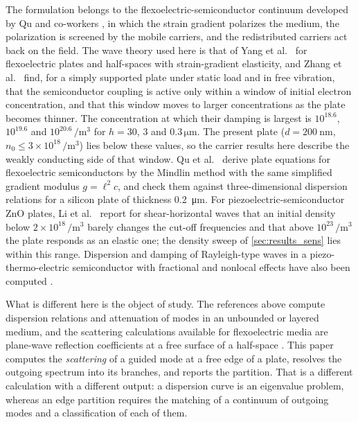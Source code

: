 The formulation belongs to the flexoelectric-semiconductor continuum developed
by Qu and co-workers \cite{qu2020mobile,qu2022thermal}, in which the strain
gradient polarizes the medium, the polarization is screened by the mobile
carriers, and the redistributed carriers act back on the field.  The wave theory used here is that of Yang et al.\ \cite{yang2018lamb,yang2020rayleigh}
for flexoelectric plates and half-spaces with strain-gradient elasticity, and Zhang et al.\ \cite{zhang2025pscplate} find, for a simply supported plate under static load and in free vibration, that the semiconductor coupling is active only within a window of initial electron concentration, and that this window moves to larger concentrations as the plate becomes thinner.  The concentration at which their damping is largest is $10^{18.6}$, $10^{19.6}$ and $10^{20.6}\,\si{\per\cubic\metre}$ for $h=30$, $3$ and $0.3\,\si{\micro\metre}$.  The present plate ($d=\SI{200}{\nano\metre}$, $n_0\le3\times10^{18}\,\si{\per\cubic\metre}$) lies below these values, so the carrier results here describe the weakly conducting side of that window.  Qu et al.\ \cite{qu2023drag} derive plate equations for flexoelectric semiconductors by the Mindlin method with the same simplified gradient modulus $g=\ell^2c$, and check them against three-dimensional dispersion relations for a silicon plate of thickness \SI{0.2}{\micro\metre}.  For piezoelectric-semiconductor ZnO plates, Li et al.\ \cite{li2023sh} report for shear-horizontal waves that an initial density below $2\times10^{18}\,\si{\per\cubic\metre}$ barely changes the cut-off frequencies and that above $10^{23}\,\si{\per\cubic\metre}$ the plate responds as an elastic one; the density sweep of \cref{sec:results_sens} lies within this range.  Dispersion and damping of Rayleigh-type waves in a piezo-thermo-electric semiconductor with fractional and nonlocal effects have also been computed \cite{aldandani2026kg}.

What is different here is the object of study.  The references above compute
dispersion relations and attenuation of modes in an unbounded or layered
medium, and the scattering calculations available for flexoelectric media are
plane-wave reflection coefficients at a free surface of a half-space
\cite{mondal2022scattering}.  This paper computes the \emph{scattering} of a
guided mode at a free edge of a plate, resolves the outgoing spectrum into its
branches, and reports the partition.  That is a different calculation with a different output: a
dispersion curve is an eigenvalue problem, whereas an edge partition requires
the matching of a continuum of outgoing modes and a classification of each of
them.

